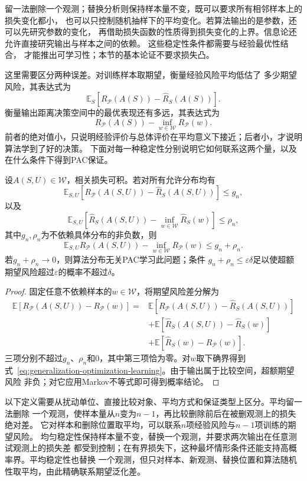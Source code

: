 留一法删除一个观测；替换分析则保持样本量不变，既可以要求所有相邻样本上的损失变化都小，
也可以只控制随机抽样下的平均变化。若算法输出的是参数，还可以先研究参数的变化，
再借助损失函数的性质得到损失变化的上界。信息论还允许直接研究输出与样本之间的依赖。
这些稳定性条件都需要与经验最优性结合，
才能推出可学习性；本节的基本论证不要求损失凸。

这里需要区分两种误差。对训练样本取期望，衡量经验风险平均低估了
多少期望风险，其表达式为
\[
 \mathbb E_S[R_{\mathcal P}(A(S))-\hat R_S(A(S))].
\]
衡量输出距离决策空间中的最优表现还有多远，其表达式为
\[
 R_{\mathcal P}(A(S))-\inf_{w\in\mathcal W}R_{\mathcal P}(w).
\]
前者的绝对值小，只说明经验评价与总体评价在平均意义下接近；后者小，才说明算法学到了好的决策。
下面对每一种稳定性分别说明它如何联系这两个量，以及在什么条件下得到PAC保证。

\begin{theorem}[期望泛化差与经验最优性]
\label{thm:generalization-optimization-learning}
设$A(S,U)\in\mathcal W$，相关损失可积。若对所有允许分布均有
\[
 \mathbb E_{S,U}[R_{\mathcal P}(A(S,U))-\hat R_S(A(S,U))]\leq g_n,
\]
以及
\[
 \mathbb E_{S,U}\!\left[\hat R_S(A(S,U))-
 \inf_{w\in\mathcal W}\hat R_S(w)\right]\leq\rho_n,
\]
其中$g_n,\rho_n$为不依赖具体分布的非负数，则
\begin{equation}
 \mathbb E_{S,U}R_{\mathcal P}(A(S,U))-
 \inf_{w\in\mathcal W}R_{\mathcal P}(w)
 \leq g_n+\rho_n.
 \label{eq:generalization-optimization-learning}
\end{equation}
若$g_n+\rho_n\to0$，则算法分布无关PAC学习此问题；条件
$g_n+\rho_n\leq\varepsilon\delta$足以使超额期望风险超过$\varepsilon$的概率不超过$\delta$。
\end{theorem}
\begin{proof}
固定任意不依赖样本的$w\in\mathcal W$，将期望风险差分解为
\begin{align*}
 \mathbb E[R_{\mathcal P}(A(S,U))-R_{\mathcal P}(w)]
 ={}&\mathbb E[R_{\mathcal P}(A(S,U))-\hat R_S(A(S,U))]\\
 &+\mathbb E[\hat R_S(A(S,U))-\hat R_S(w)]\\
 &+\mathbb E[\hat R_S(w)-R_{\mathcal P}(w)].
\end{align*}
三项分别不超过$g_n$、$\rho_n$和0，其中第三项恰为零。对$w$取下确界得到
式~\eqref{eq:generalization-optimization-learning}。由于输出属于比较空间，超额期望风险
非负；对它应用Markov不等式即可得到概率结论。
\end{proof}

以下定义需要从扰动单位、直接比较对象、平均方式和保证类型上区分。平均留一法删除
一个观测，使样本量从$n$变为$n-1$，再比较删除前后在被删观测上的损失绝对差。
它对样本和删除位置取平均，可以联系$n$项经验风险与$n-1$项训练的期望风险。
均匀稳定性保持样本量不变，替换一个观测，并要求两次输出在任意测试观测上的损失差
都受到控制；在有界损失下，这种最坏情形条件还能支持高概率界。平均稳定性也替换
一个观测，但只对样本、新观测、替换位置和算法随机性取平均，由此精确联系期望泛化差。

